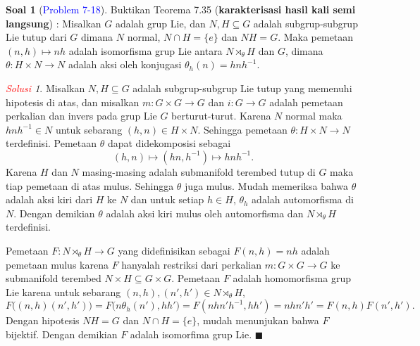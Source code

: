 \documentclass[11pt]{article}
\theoremstyle{definition}
\newtheorem*{problem}{Soal}
\theoremstyle{remark}
\newtheorem*{solution}{\textcolor{red}{Solusi}}
\begin{document}
\begin{problem}[\textcolor{blue}{Problem 7-18}] 
Buktikan Teorema 7.35 (\textbf{karakterisasi hasil kali semi langsung}) :
Misalkan $G$ adalah grup Lie, dan $N,H \subseteq G$ adalah subgrup-subgrup Lie tutup dari $G$ dimana $N$ normal, $N \cap H = \{e\}$ dan $NH = G$. Maka pemetaan $(n,h) \mapsto nh$ adalah isomorfisma grup Lie antara $N \rtimes_{\theta} H$ dan $G$, dimana $\theta : H \times N \to N$ adalah aksi oleh konjugasi $\theta_h(n) = hnh^{-1}$.
\end{problem}
\begin{solution}
Misalkan $N,H \subseteq G$ adalah subgrup-subgrup Lie tutup yang memenuhi hipotesis di atas, dan misalkan $m: G \times G \to G$ dan $i : G \to G$ adalah pemetaan perkalian dan invers pada grup Lie $G$ berturut-turut. Karena $N$ normal maka $hnh^{-1} \in N$ untuk sebarang $(h,n)\in H \times N$. Sehingga pemetaan $\theta : H \times N \to N$ terdefinisi. Pemetaan $\theta$ dapat didekomposisi sebagai 
$$
(h,n) \mapsto (hn,h^{-1}) \mapsto hnh^{-1}.
$$ 
Karena $H$ dan $N$ masing-masing adalah submanifold terembed tutup di $G$ maka tiap pemetaan di atas mulus. Sehingga $\theta$ juga mulus. Mudah memeriksa bahwa $\theta$ adalah aksi kiri dari $H$ ke $N$ dan untuk setiap $h \in H$, $\theta_h$ adalah automorfisma di $N$. Dengan demikian $\theta$ adalah aksi kiri mulus oleh automorfisma dan $N \rtimes_{\theta} H $ terdefinisi.

Pemetaan $F : N \rtimes_{\theta} H \to G $ yang didefinisikan sebagai $F(n,h)=nh$ adalah pemetaan mulus karena $F$ hanyalah restriksi dari perkalian $m : G \times G \to G$ ke submanifold terembed $N \times H \subseteq G \times G$. Pemetaan $F$ adalah homomorfisma grup Lie karena untuk sebarang $(n,h),(n',h') \in N \rtimes_{\theta} H$,
$$
F\Big( (n,h)(n',h') \Big) = F\big(n\theta_{h}(n'),hh'\big) = F(nhn'h^{-1},hh') = nhn'h' = F(n,h)F(n',h').
$$
Dengan hipotesis $NH = G$ dan $N \cap H = \{e\}$, mudah menunjukan bahwa $F$ bijektif. Dengan demikian $F$ adalah isomorfima grup Lie. $\blacksquare$
\end{solution}
\end{document}
